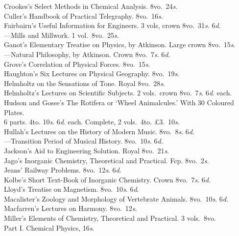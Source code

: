 \documentclass[letterpaper,12pt,oneside,openany]{memoir}
\newcommand{\D}{\hspace*{5mm}}
\newcommand{\E}{\hspace*{2mm}---\hspace*{2mm}}
\begin{document}
\begin{footnotesize}
Crookes's Select Methods in Chemical Analysis. 8vo.\ 24\textit{s}.\\
Culler's Handbook of Practical Telegraphy. 8vo.\ 16\textit{s}.\\
Fairbairn's Useful Information for Engineers. 3 vols, crown 8vo.\ 31\textit{s}. 6\textit{d}.\\
\E Mills and Millwork. 1 vol.\ 8vo.\ 25\textit{s}.\\
Ganot's Elementary Treatise on Physics, by Atkinson. Large crown 8vo.\ 15\textit{s}.\\
\E Natural Philosophy, by Atkinson. Crown 8vo.\ 7\textit{s}. 6\textit{d}.\\
Grove's Correlation of Physical Forces. 8vo.\ 15\textit{s}.\\
Haughton's Six Lectures on Physical Geography. 8vo.\ 19\textit{s}.\\
Helmholtz on the Sensations of Tone. Royal 8vo.\ 28\textit{s}.\\
Helmholtz's Lectures on Scientific Subjects. 2 vols.\ crown 8vo.\ 7\textit{s}. 6\textit{d}. each.\\
Hudson and Gosse's The Rotifera or `Wheel Animalcules.' With 30 Coloured Plates.\\
\D 6 parts. 4to. 10\textit{s}. 6\textit{d}. each. Complete, 2 vols.\ 4to. \pounds3.\ 10\textit{s}.\\
Hullah's Lectures on the History of Modern Music. 8vo.\ 8\textit{s}. 6\textit{d}.\\
\E Transition Period of Musical History. 8vo.\ 10\textit{s}. 6\textit{d}.\\
Jackson's Aid to Engineering Solution. Royal 8vo.\ 21\textit{s}.\\
Jago's Inorganic Chemistry, Theoretical and Practical. Fcp. 8vo.\ 2\textit{s}.\\
Jeans' Railway Problems. 8vo.\ 12\textit{s}. 6\textit{d}.\\
Kolbe's Short Text-Book of Inorganic Chemistry. Crown 8vo.\ 7\textit{s}. 6\textit{d}.\\
Lloyd's Treatise on Magnetism. 8vo.\ 10\textit{s}. 6\textit{d}.\\
Macalister's Zoology and Morphology of Vertebrate Animals. 8vo.\ 10\textit{s}. 6\textit{d}.\\
Macfarren's Lectures on Harmony. 8vo.\ 12\textit{s}.\\
Miller's Elements of Chemistry, Theoretical and Practical. 3 vols.\ 8vo.\ \\
\D Part I\@. Chemical Physics, 16\textit{s}.\\

\end{footnotesize}
\end{document}

